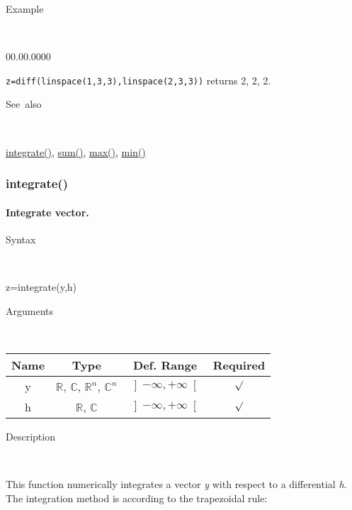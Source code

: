 \begin{description}
\item [Example]~
\end{description}
\begin{lyxlist}{00.00.0000}
\item [\texttt{z=diff(linspace(1,3,3),linspace(2,3,3))}]returns 2, 2, 2.
\end{lyxlist}
\begin{description}
\item [See~also]~
\end{description}
\textcolor{blue}{\hyperlink{integrate}{integrate()}}\textcolor{black}{,}
\textcolor{blue}{\hyperlink{sum}{sum()}}\textcolor{black}{,} \textcolor{blue}{\hyperlink{max}{max()}}\textcolor{black}{,}
\textcolor{blue}{\hyperlink{min}{min()}}


\newpage
\subsubsection*{\hypertarget{integrate}{}{\Large integrate()}}


\paragraph{\label{par:Integrate}Integrate vector.}

\begin{description}
\item [Syntax]~
\end{description}
z=integrate(y,h)

\begin{description}
\item [Arguments]~
\end{description}
\begin{tabular}{|c|c|c|c|}
\hline 
Name&
Type&
Def. Range&
Required\tabularnewline
\hline
\hline 
y&
$\mathbb{R}$, $\mathbb{C}$, $\mathbb{R}^{n}$, $\mathbb{C}^{n}$&
$\left]-\infty,+\infty\right[$&
$\surd$\tabularnewline
\hline 
h&
$\mathbb{R}$, $\mathbb{C}$&
$\left]-\infty,+\infty\right[$&
$\surd$\tabularnewline
\hline
\end{tabular}

\begin{description}
\item [Description]~
\end{description}
This function numerically integrates a vector \textit{y} with respect
to a differential \textit{h}. The integration method is according
to the trapezoidal rule:

